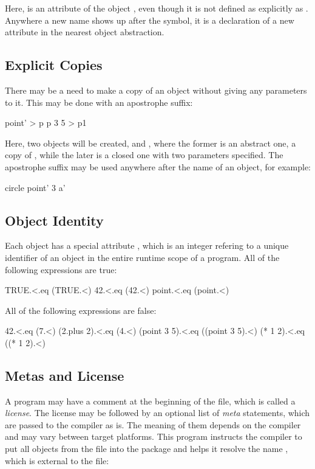 Here,  is an attribute of the object , even though
it is not defined as explicitly as . Anywhere a new
name shows up after the \ff{>} symbol, it is a declaration of a new
attribute in the nearest object abstraction.

\subsection{Explicit Copies}

There may be a need to make a copy of an object without giving any
parameters to it. This may be done with an apostrophe suffix:

\begin{ffcode}
point' > p
p 3 5 > p1
\end{ffcode}

Here, two objects will be created,  and , where
the former is an abstract one, a copy of , while the
later is a closed one with two parameters specified. The
apostrophe suffix may be used anywhere after the name of an object,
for example:

\begin{ffcode}
circle
  point' 3 a'
\end{ffcode}

\subsection{Object Identity}

Each object has a special attribute \ff{<}, which is an integer
refering to a unique identifier of an object in the entire
runtime scope of a program. All of the following expressions are true:

\begin{ffcode}
TRUE.<.eq (TRUE.<)
42.<.eq (42.<)
point.<.eq (point.<)
\end{ffcode}

All of the following expressions are false:

\begin{ffcode}
42.<.eq (7.<)
(2.plus 2).<.eq (4.<)
(point 3 5).<.eq ((point 3 5).<)
(* 1 2).<.eq ((* 1 2).<)
\end{ffcode}

\subsection{Metas and License}

A program may have a comment at the beginning of the file, which
is called a \emph{license}. The license may be followed by an optional
list of \emph{meta} statements, which are passed to the compiler
as is. The meaning of them depends on the compiler and may vary
between target platforms. This program instructs the compiler
to put all objects from the file into the package 
and helps it resolve the name , which is external
to the file:

